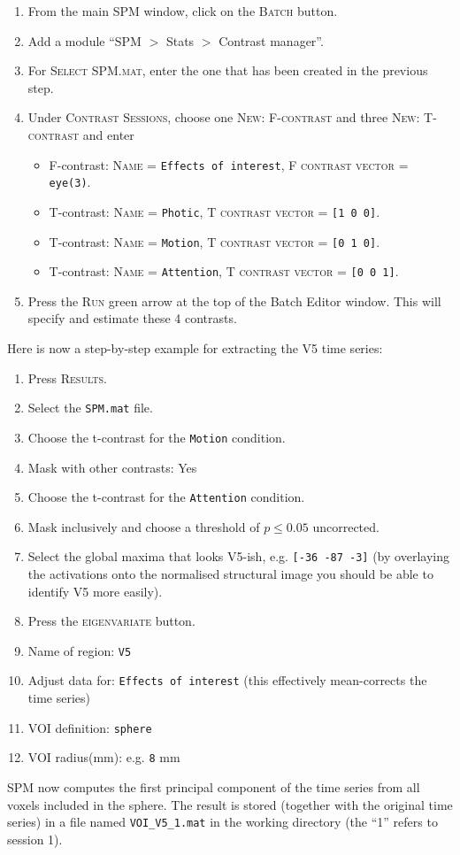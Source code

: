 \begin{enumerate}
 \item From the main SPM window, click on the \textsc{Batch} button.
 \item Add a module ``SPM $>$ Stats $>$ Contrast manager''.
 \item For \textsc{Select SPM.mat}, enter the one that has been created in the previous step.
 \item Under \textsc{Contrast Sessions}, choose one \textsc{New: F-contrast} and three \textsc{New: T-contrast} and enter
 \begin{itemize}
  \item F-contrast: \textsc{Name} = \texttt{Effects of interest}, \textsc{F contrast vector} = \texttt{eye(3)}.
  \item T-contrast: \textsc{Name} = \texttt{Photic}, \textsc{T contrast vector} = \texttt{[1 0 0]}.
  \item T-contrast: \textsc{Name} = \texttt{Motion}, \textsc{T contrast vector} = \texttt{[0 1 0]}.
  \item T-contrast: \textsc{Name} = \texttt{Attention}, \textsc{T contrast vector} = \texttt{[0 0 1]}.
 \end{itemize}
 \item Press the \textsc{Run} green arrow at the top of the Batch Editor window. This will specify and estimate these 4 contrasts.
\end{enumerate}

Here is now a step-by-step example for extracting the V5 time series:
\begin{enumerate}
 \item Press \textsc{Results}.
 \item Select the \texttt{SPM.mat} file.
 \item Choose the t-contrast for the \texttt{Motion} condition.
 \item Mask with other contrasts: Yes
 \item Choose the t-contrast for the \texttt{Attention} condition.
 \item Mask inclusively and choose a threshold of $p \leq 0.05$ uncorrected.
 \item Select the global maxima that looks V5-ish, e.g. \texttt{[-36 -87 -3]} (by overlaying the activations onto the normalised structural image you should be able to identify V5 more easily).
 \item Press the \textsc{eigenvariate} button.
 \item Name of region: \texttt{V5}
 \item Adjust data for: \texttt{Effects of interest} (this effectively mean-corrects the time series)
 \item VOI definition: \texttt{sphere}
 \item VOI radius(mm): e.g. \texttt{8} mm
\end{enumerate}
SPM now computes the first principal component of the time series from all voxels included in the sphere. The result is stored (together with the original time series) in a file named \texttt{VOI\_V5\_1.mat} in the working directory (the ``1'' refers to session 1).

